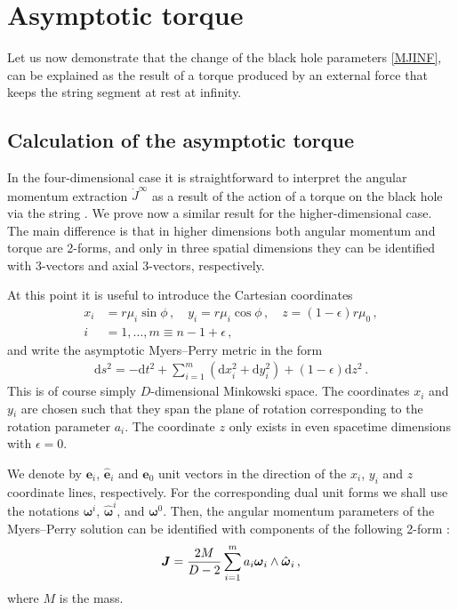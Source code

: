 \documentclass[superscriptaddress,twocolumn,showpacs,
preprintnumbers,amsmath,amssymb,nofootinbib,
longbibliography,aps,prd,10pt]{revtex4-1}
\newcommand{\ts}[1]{{\boldsymbol{#1}}}         %
\newcommand{\dd}{\mbox{d}}
\begin{document}
\section{Asymptotic torque}
Let us now demonstrate that the change of the black hole parameters \eqref{MJINF}, can be explained as the result of a torque produced by an external force that keeps the string segment at rest at infinity.

\subsection{Calculation of the asymptotic torque}

In the four-dimensional case it is straightforward to interpret the angular momentum extraction $\dot{J}^\infty$ as a result of the action of a torque on the black hole via the string \cite{Boos:2017pyd}. We prove now a similar result for the higher-dimensional case. The main difference is that in higher dimensions both angular momentum and torque are 2-forms, and only in three spatial dimensions they can be identified with 3-vectors and axial 3-vectors, respectively.

At this point it is useful to introduce the Cartesian coordinates
\begin{align}
x_i&=r \mu_i \sin\phi\, , \quad y_i=r \mu_i \cos\phi\, , \quad z=(1-\epsilon)r\mu_0 \, , \nonumber \\
i&=1,\dots,m\equiv n-1+\epsilon \, ,
\end{align}
and write the asymptotic Myers--Perry metric in the form
\begin{align}
\dd s^2 = -\dd t^2 + \sum\limits_{i=1}^m \left( \dd x_i^2 + \dd y_i^2 \right) + \left(1-\epsilon \right) \dd z^2 \, .
\end{align}
This is of course simply $D$-dimensional Minkowski space. The coordinates $x{}_i$ and $y{}_i$ are chosen such that they span the plane of rotation corresponding to the rotation parameter $a_i$. The coordinate $z$ only exists in even spacetime dimensions with $\epsilon=0$.

We denote by $\ts{e}_i$, $\hat{\ts{e}}_i$ and $\ts{e}_0$ unit vectors in the direction of the $x_i$, $y_i$ and $z$ coordinate lines, respectively. For the corresponding dual unit forms we shall use the notations $\ts{\omega}^i$, $\hat{\ts{\omega}}^i$, and $\ts{\omega}^0$. Then, the angular momentum parameters of the Myers--Perry solution can be identified with components of the following 2-form \cite{Myers:1986un}:
\begin{align}
\ts{J} = {2M\over D-2} \sum\limits_{i=1}^m  a_i \ts{\omega}_i \wedge \hat{\ts{\omega}}_i \, , \label{eq:angular-momentum}
\end{align}
where $M$ is the mass.
\end{document}
